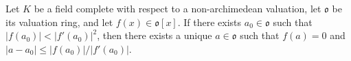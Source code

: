 Let $K$ be a field complete with respect to a non-archimedean valuation, let $\mathfrak{o}$ be its valuation ring, and let $f(x) \in \mathfrak{o}[x]$. If there exists $a_0 \in \mathfrak{o}$ such that $|f(a_0)| < |f'(a_0)|^2$, then there exists a unique $a \in \mathfrak{o}$ such that $f(a) = 0$ and $|a - a_0| \leq |f(a_0)|/|f'(a_0)|$.
